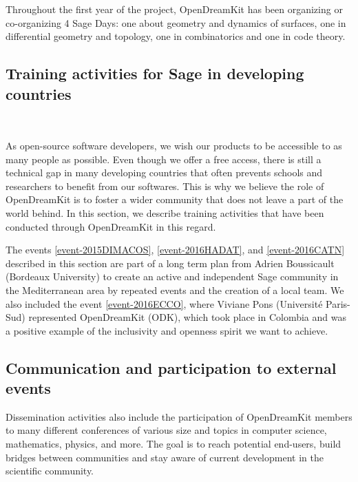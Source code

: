 \documentclass{deliverablereport}
\begin{document}
Throughout the first year of the project, OpenDreamKit has been organizing or co-organizing
4 Sage Days: one about geometry and dynamics of surfaces, one in differential geometry and topology,
 one in combinatorics and one in code theory.








\newpage
\subsection{Training activities for Sage in developing countries}
~

As open-source software developers, we wish our products
to be accessible to as many people as possible. Even though we offer
 a free access, there is still a technical gap in many 
developing countries that 
often prevents schools and researchers to benefit from our softwares.
This is why we believe the role of OpenDreamKit is to foster 
a wider community that does not leave a part of the world behind. In 
this section, we describe training activities that have been conducted 
through OpenDreamKit in this regard.



The events \ref{event-2015DIMACOS}, \ref{event-2016HADAT}, and \ref{event-2016CATN} described in this section are part of a long term
plan from Adrien Boussicault (Bordeaux University) to create an active 
and independent Sage community in the Mediterranean area by repeated 
events and the creation of a local team. We also included the event \ref{event-2016ECCO}, where Viviane Pons (Université Paris-Sud) represented OpenDreamKit (ODK), 
which took place in Colombia and was a positive example of the inclusivity 
and openness spirit we want to achieve.








\newpage

\subsection{Communication and participation to external events}

Dissemination activities also include the participation of OpenDreamKit
members to many different conferences of various size and topics
in computer science, mathematics, physics, and more. The goal is
to reach potential end-users, build bridges between communities and stay aware 
of current development in the scientific community.
\end{document}
